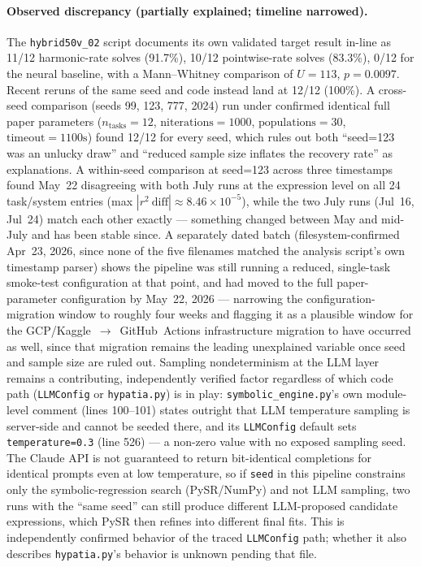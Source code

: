 \documentclass[11pt]{article}
\begin{document}
\paragraph{Observed discrepancy (partially explained; timeline
narrowed).} The \texttt{hybrid50v\_02} script documents its own
validated target result in-line as 11/12 harmonic-rate solves (91.7\%),
10/12 pointwise-rate solves (83.3\%), 0/12 for the neural baseline, with a
Mann--Whitney comparison of $U{=}113$, $p{=}0.0097$. Recent reruns of the
same seed and code instead land at 12/12 (100\%). A cross-seed comparison
(seeds 99, 123, 777, 2024) run under confirmed identical full paper
parameters ($n_{\text{tasks}}{=}12$, $\text{niterations}{=}1000$,
$\text{populations}{=}30$, $\text{timeout}{=}1100\text{s}$) found 12/12
for every seed, which rules out both ``seed=123 was an unlucky draw'' and
``reduced sample size inflates the recovery rate'' as explanations. A
within-seed comparison at seed=123 across three timestamps found May~22
disagreeing with both July runs at the expression level on all 24
task/system entries (max $|r^2\ \text{diff}|\approx 8.46\times10^{-5}$),
while the two July runs (Jul~16, Jul~24) match each other exactly ---
something changed between May and mid-July and has been stable since. A
separately dated batch (filesystem-confirmed Apr~23, 2026, since none of
the five filenames matched the analysis script's own timestamp parser)
shows the pipeline was still running a reduced, single-task smoke-test
configuration at that point, and had moved to the full paper-parameter
configuration by May~22, 2026 --- narrowing the configuration-migration
window to roughly four weeks and flagging it as a plausible window for
the GCP/Kaggle~$\to$~GitHub~Actions infrastructure migration to have
occurred as well, since that migration remains the leading unexplained
variable once seed and sample size are ruled out. Sampling
nondeterminism at the LLM layer remains a contributing, independently
verified factor regardless of which code path (\texttt{LLMConfig} or
\texttt{hypatia.py}) is in play: \texttt{symbolic\_engine.py}'s own
module-level comment (lines 100--101) states outright that LLM
temperature sampling is server-side and cannot be seeded there, and its
\texttt{LLMConfig} default sets \texttt{temperature=0.3} (line 526) ---
a non-zero value with no exposed sampling seed. The Claude API is not
guaranteed to return bit-identical completions for identical prompts even
at low temperature, so if \texttt{seed} in this pipeline constrains only
the symbolic-regression search (PySR/NumPy) and not LLM sampling, two
runs with the ``same seed'' can still produce different LLM-proposed
candidate expressions, which PySR then refines into different final
fits. This is independently confirmed behavior of the traced
\texttt{LLMConfig} path; whether it also describes \texttt{hypatia.py}'s
behavior is unknown pending that file.
\end{document}

